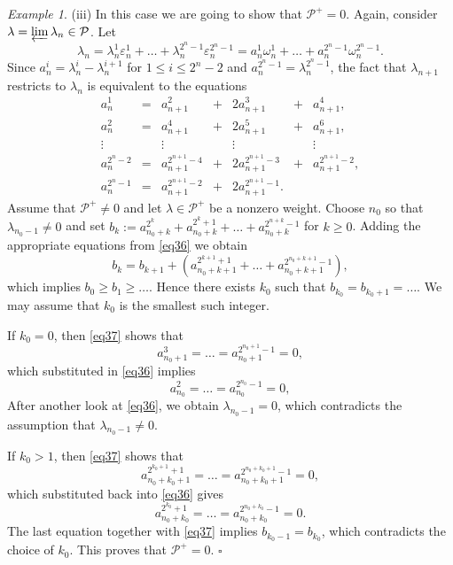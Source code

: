\documentclass[12pt]{amsart}
\def\cP{\mathcal{P}}
\def\proj{\varprojlim}
\def\vep{\varepsilon}
\theoremstyle{remark}
\newtheorem{example}[equation]{Example}
\begin{document}
\begin{example}
\noindent
(iii) In this case we are going to show that $\cP^+ = 0$.
Again, consider $\lambda = \proj \lambda_n \in \cP$. Let 
\begin{equation*} \label{eq35}
\lambda_n  =  \lambda_n^1 \vep_n^1 + \ldots + \lambda_n^{2^n-1} \vep_n^{2^n-1} 
=  a_n^1 \omega_n^1 + \ldots + a_n^{2^n-1} \omega_n^{2^n-1}.
\end{equation*}
Since $a_n^i = \lambda_n^i - \lambda_n^{i+1}$ for $1 \leq i \leq 2^n-2$ and $a_n^{2^n-1} = \lambda_n^{2^n-1}$, 
the fact that $\lambda_{n+1}$ restricts to $\lambda_n$ is equivalent to the equations
\begin{equation} \label{eq36}
\begin{array}{ccccccc}
a_n^1 & = & a_{n+1}^2 &+& 2 a_{n+1}^3 &+& a_{n+1}^4,\\
a_n^2 & = & a_{n+1}^4 &+& 2 a_{n+1}^5 &+& a_{n+1}^6,\\
\vdots &  &  \vdots &&  \vdots && \vdots\\
a_n^{2^n-2} & = & a_{n+1}^{2^{n+1}-4} & + & 2 a_{n+1}^{2^{n+1}-3} & + & a_{n+1}^{2^{n+1}-2},\\
a_n^{2^n-1} & = & a_{n+1}^{2^{n+1}-2} & + & 2 a_{n+1}^{2^{n+1}-1} .&  &
\end{array}
\end{equation}
Assume that $\cP^+ \neq 0$ and let $\lambda \in \cP^+$ be a nonzero weight. Choose $n_0$ so that
$\lambda_{n_0-1} \neq 0$
and set $b_k := a_{n_0+k}^{2^k} + a_{n_0+k}^{2^k +1} + \ldots + a_{n_0+k}^{2^{n+k}-1}$ for
$k \geq 0$. Adding the appropriate equations from \eqref{eq36} we obtain
\begin{equation} \label{eq37}
b_k = b_{k+1} + (a_{n_0 + k+1}^{2^{k+1} +1} + \ldots + a_{n_0+k+1}^{2^{n_0+k+1}-1}),
\end{equation}
which implies $b_0 \geq b_1 \geq \ldots$. Hence there exists $k_0$ such that $b_{k_0} = b_{k_0+1} = \ldots$. We may assume 
that $k_0$ is the smallest such integer. 

If $k_0 = 0$, then \eqref{eq37} shows that
$$
a_{n_0 + 1}^{ 3} = \ldots = a_{n_0+1}^{2^{n_0+1}-1} = 0,
$$
which substituted in \eqref{eq36} implies 
$$
a_{n_0}^{ 2} = \ldots = a_{n_0}^{2^{n_0}-1} = 0,
$$
After another look at \eqref{eq36}, we obtain $\lambda_{n_0-1} = 0$, which contradicts the assumption that 
$\lambda_{n_0-1} \neq 0$.

If $k_0>1$,  then \eqref{eq37} shows that 
$$
a_{n_0 + k_0+1}^{2^{k_0+1} +1} = \ldots = a_{n_0+k_0+1}^{2^{n_0+k_0+1}-1} = 0,
$$
which substituted back into \eqref{eq36} gives
$$
a_{n_0 + k_0}^{2^{k_0} +1} = \ldots = a_{n_0+k_0}^{2^{n_0+k_0}-1} = 0.
$$
The last equation together with \eqref{eq37} implies $b_{k_0-1} = b_{k_0}$, which contradicts the choice of $k_0$. 
This proves that $\cP^+ = 0$.
\hfill $\square$
\end{example}
\end{document}
